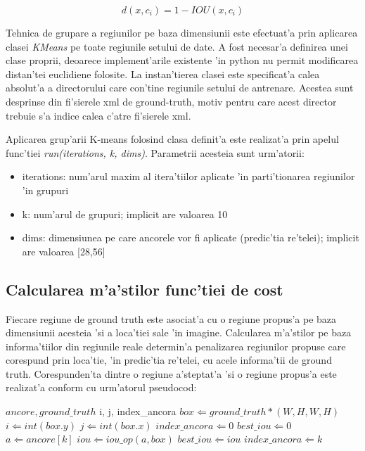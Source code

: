 \documentclass[12pt,a4paper,twoside]{report}
\begin{document}
\begin{equation}
d(x, c_i) = 1 - IOU(x, c_i)
\label{eq:dist_iou}
\end{equation}

Tehnica de grupare a regiunilor pe baza dimensiunii este efectuat'a prin aplicarea clasei \textit{KMeans} pe toate regiunile setului de date. A fost necesar'a definirea unei clase proprii, deoarece implement'arile existente 'in python nu permit modificarea distan'tei euclidiene folosite. La instan'tierea clasei este specificat'a calea absolut'a a directorului care con'tine regiunile setului de antrenare. Acestea sunt desprinse din fi'sierele xml de ground-truth, motiv pentru care acest director trebuie s'a indice calea c'atre fi'sierele xml. 

Aplicarea grup'arii K-means folosind clasa definit'a este realizat'a prin apelul func'tiei \textit{run(iterations, k, dims)}. Parametrii acesteia sunt urm'atorii:
\begin{itemize}
\item iterations: num'arul maxim al itera'tiilor aplicate 'in parti'tionarea regiunilor 'in grupuri
\item k: num'arul de grupuri; implicit are valoarea 10
\item dims: dimensiunea pe care ancorele vor fi aplicate (predic'tia re'telei); implicit are valoarea [28,56]
\end{itemize}
 
\subsection{Calcularea m'a'stilor func'tiei de cost}
Fiecare regiune de ground truth este asociat'a cu o regiune propus'a pe baza dimensiunii acesteia 'si a loca'tiei sale 'in imagine. Calcularea m'a'stilor pe baza informa'tiilor din regiunile reale determin'a penalizarea regiunilor propuse care corespund prin loca'tie, 'in predic'tia re'telei, cu acele informa'tii de ground truth. Corespunden'ta dintre o regiune a'steptat'a 'si o regiune propus'a este realizat'a conform cu urm'atorul pseudocod:
\newpage
\begin{algorithmic}
\Require $ancore, ground\_truth$
\Ensure i, j, index\_ancora 
\State $box \Leftarrow ground\_truth * (W, H, W, H)$
\State $i \Leftarrow int(box.y)$
\State $j \Leftarrow int(box.x)$
\State $index\_ancora \Leftarrow 0$
\State $best\_iou \Leftarrow 0$
\State $a \Leftarrow ancore[k]$
\State $iou \Leftarrow iou\_op(a, box)$ 
  \State $best\_iou\Leftarrow iou$
  \State $index\_ancora \Leftarrow k$
\EndIf
\EndFor
\end{algorithmic}
\end{document}
